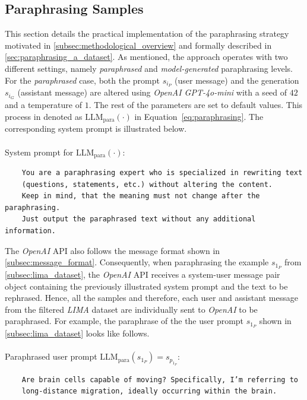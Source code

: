 \subsection{Paraphrasing Samples}\label{sec:paraphrasing_samples}
This section details the practical implementation of the paraphrasing strategy motivated in \autoref{subsec:methodological_overview} and formally described in \autoref{sec:paraphrasing_a_dataset}. As mentioned, the approach operates with two different settings, namely \emph{paraphrased} and \emph{model-generated} paraphrasing levels. For the \emph{paraphrased} case, both the prompt $s_{i_P}$ (user message) and the generation $s_{i_G}$ (assistant message) are altered using \emph{OpenAI GPT-4o-mini} with a seed of $42$ and a temperature of $1$. The rest of the parameters are set to default values. This process in denoted as $\operatorname{LLM_{para}}(\cdot)$ in Equation~\ref{eq:paraphrasing}. The corresponding system prompt is illustrated below.
\\\\
System prompt for $\operatorname{LLM_{para}}(\cdot)$:
\begin{verbatim}
    You are a paraphrasing expert who is specialized in rewriting text 
    (questions, statements, etc.) without altering the content. 
    Keep in mind, that the meaning must not change after the paraphrasing. 
    Just output the paraphrased text without any additional information.
\end{verbatim}
The \emph{OpenAI} API also follows the message format shown in \autoref{subsec:message_format}. Consequently, when paraphrasing the example $s_{1_P}$ from \autoref{subsec:lima_dataset}, the \emph{OpenAI} API receives a system-user message pair object containing the previously illustrated system prompt and the text to be rephrased. Hence, all the samples and therefore, each user and assistant message from the filtered \emph{LIMA} dataset are individually sent to \emph{OpenAI} to be paraphrased. For example, the paraphrase of the the user prompt $s_{1_P}$ shown in \autoref{subsec:lima_dataset} looks like follows.
\\\\
Paraphrased user prompt $\operatorname{LLM_{para}}(s_{1_P}) = s_{p_{1_P}}$:
\begin{verbatim}
    Are brain cells capable of moving? Specifically, I’m referring to
    long-distance migration, ideally occurring within the brain.
\end{verbatim}

